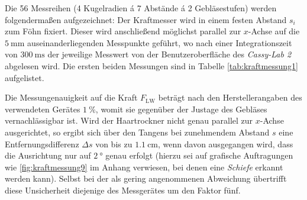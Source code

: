 Die 56 Messreihen (4 Kugelradien á 7 Abstände á 2 Gebläsestufen) werden folgendermaßen aufgezeichnet: Der Kraftmesser wird in einem festen Abstand $s_i$ zum Föhn fixiert. Dieser wird anschließend möglichst parallel zur $x$-Achse auf die $\SI{5}{\milli\metre}$ auseinanderliegenden Messpunkte geführt, wo nach einer Integrationszeit von $\SI{300}{\milli\second}$ der jeweilige Messwert von der Benutzeroberfläche des \textit{Cassy-Lab 2} abgelesen wird. Die ersten beiden Messungen sind in Tabelle \ref{tab:kraftmessung1} aufgelistet.



\noindent Die Messungenauigkeit auf die Kraft $F_\mathrm{LW}$ beträgt nach den Herstellerangaben des verwendeten Gerätes $\SI{1}{\percent}$, womit sie gegenüber der Justage des Gebläses vernachlässigbar ist. Wird der Haartrockner nicht genau parallel zur $x$-Achse ausgerichtet, so ergibt sich über den Tangens bei zunehmendem Abstand $s$ eine Entfernungsdifferenz $\Delta s$ von bis zu $\SI{1.1}{\centi\metre}$, wenn davon ausgegangen wird, dass die Ausrichtung nur auf $\SI{2}{\degree}$ genau erfolgt (hierzu sei auf grafische Auftragungen wie \ref{fig:kraftmessung9} im Anhang verwiesen, bei denen eine \textit{Schiefe} erkannt werden kann). Selbst bei der als gering angenommenen Abweichung übertrifft diese Unsicherheit diejenige des Messgerätes um den Faktor fünf.



